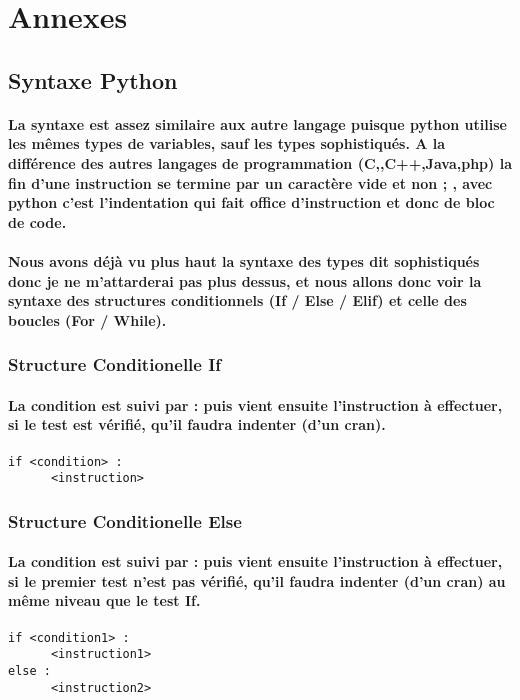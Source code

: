 \documentclass[a4paper, 12pt, twoside]{article}
\begin{document}
\newpage
\section{Annexes}
\subsection{Syntaxe Python}
\paragraph{La syntaxe est assez similaire aux autre langage puisque python utilise les mêmes types de variables, sauf les types sophistiqués. A la différence des autres langages de programmation (C,,C++,Java,php) la fin d'une instruction se termine par un caractère vide
et non  ; , avec python c'est l'indentation qui fait office d'instruction et donc de bloc de code.}
\paragraph{Nous avons déjà vu plus haut la syntaxe des types dit sophistiqués donc je ne m'attarderai pas plus dessus, et nous allons donc voir la syntaxe des structures conditionnels (If / Else / Elif) et celle des boucles (For / While).}
\subsubsection{ Structure Conditionelle If }
\paragraph{La condition est suivi par  :  puis vient ensuite l'instruction à effectuer, si le test est vérifié, qu'il faudra indenter (d'un cran).}
\begin{verbatim}
if <condition> :
      <instruction>
\end{verbatim}
\subsubsection{ Structure Conditionelle Else}
\paragraph{La condition est suivi par  :  puis vient ensuite l'instruction à effectuer, si le premier test n'est pas vérifié, qu'il faudra indenter (d'un cran) au même niveau que le test If.}
\begin{verbatim}
if <condition1> :
      <instruction1>
else :
      <instruction2>
\end{verbatim}
\end{document}
